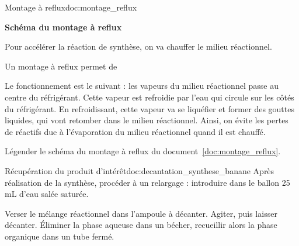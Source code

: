 \begin{doc}{Montage à reflux}{doc:montage_reflux}
  \vspace*{-24pt}
  \begin{encart}
    \begin{center}
      
      \vspace*{-8pt}
      \textbf{\small{Schéma du montage à reflux}}
    \end{center}
  \end{encart}
  Pour accélérer la réaction de synthèse, on va chauffer le milieu réactionnel.
  
  Un montage à reflux permet de 
  
  Le fonctionnement est le suivant : les vapeurs du milieu réactionnel passe au centre du réfrigérant.
  Cette vapeur est refroidie par l'eau qui circule sur les côtés du réfrigérant.
  En refroidissant, cette vapeur va se liquéfier et former des gouttes liquides, qui vont retomber dans le milieu réactionnel.
  Ainsi, on évite les pertes de réactifs due à l'évaporation du milieu réactionnel quand il est chauffé.
\end{doc}

\numeroQuestion Légender le schéma du montage à reflux du document~\ref{doc:montage_reflux}.



\begin{doc}{Récupération du produit d'intérêt}{doc:decantation_synthese_banane}
  Après réalisation de la synthèse, procéder à un relargage : introduire dans le ballon 25 mL d'eau salée saturée.
  \vspace*{-8pt}
  \begin{center}
  \end{center}
  \vspace*{-16pt}
  Verser le mélange réactionnel dans l'ampoule à décanter.
  Agiter, puis laisser décanter.
  Éliminer la phase aqueuse dans un bécher, recueillir alors la phase organique dans un tube fermé.
\end{doc}




